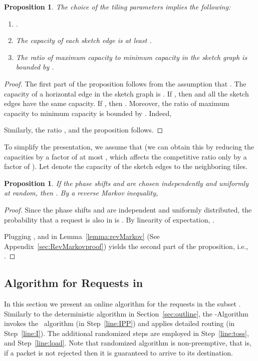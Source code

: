 \documentclass[11pt]{article}
\newtheorem{proposition}[theorem]{Proposition}
\newcommand{\route}{\text{\sc{ipp}}}
\newenvironment{proof sketch}[1]{\noindent {\emph{Proof sketch of #1:}}}{\hfill \qed}
\newcommand{\far}{\text{\emph{Far}}}
\begin{document}
\begin{proposition}\label{prop:tiling}
The choice of the tiling parameters implies the following:
  \begin{enumerate}
\item .
  \item The capacity of each sketch edge is at least .
  \item The ratio of maximum capacity to minimum capacity in the sketch graph is bounded by .
 \end{enumerate}
\end{proposition}

\begin{proof}
  The first part of the proposition follows from the assumption that .  The capacity  of a horizontal edge  in the sketch graph is .
If , then  and all the sketch edges have the same capacity.
If , then .
Moreover, the ratio of maximum capacity to minimum capacity is bounded
by . Indeed,
      
Similarly, the ratio , and the proposition follows.
\end{proof}

To simplify the presentation, we assume that 
(we can obtain this by reducing the capacities by a factor
of at most , which affects the competitive ratio only by
a factor of ). Let  denote the capacity of the
sketch edges to the neighboring tiles.



\begin{proposition} \label{prop:class}
  If the phase shifts  and  are
  chosen independently and uniformly at random, then .  By a reverse Markov inequality, 
\end{proposition}


\begin{proof}
  Since the phase shifts  and  are independent
  and uniformly distributed, the probability that a request 
  is also in  is .  By linearity of expectation, .

  Plugging ,  and
   in Lemma~\ref{lemma:revMarkov} (See
  Appendix~\ref{sec:RevMarkovproof}) yields the second part of the
  proposition, i.e., .
\end{proof}


\subsection{Algorithm for Requests in \far}\label{sec:far}
In this section we present an online algorithm for the
requests in the subset . Similarly to the
deterministic algorithm in Section~\ref{sec:outline}, the
-Algorithm invokes the \route\ algorithm (in
Step~\ref{line:IPP}) and applies detailed routing (in
Step~\ref{line:I}). The additional randomized steps are
employed in Step~\ref{line:toss}, and Step~\ref{line:load}.
Note that randomized algorithm is non-preemptive, that is,
if a packet is not rejected then it is guaranteed to arrive
to its destination.
\end{document}

